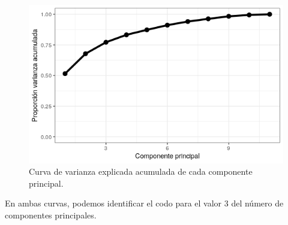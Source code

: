 \documentclass[12pt]{article}
\begin{document}
\begin{figure}[H]
  \centering
  \includegraphics[width=120mm]{imgs/elbow-cumsum}
  \caption{Curva de varianza explicada acumulada de cada componente
    principal.}
\end{figure}

En ambas curvas, podemos identificar el codo para el valor 3 del
número de componentes principales.
\end{document}
